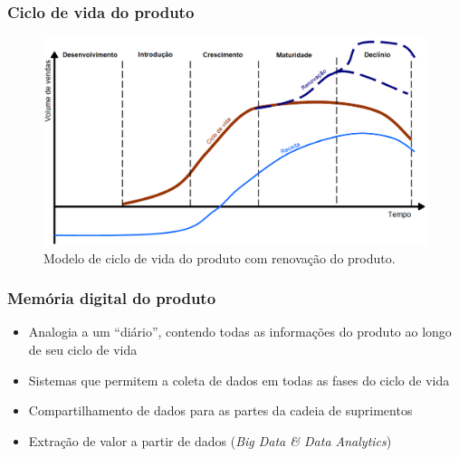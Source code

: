 \documentclass[10pt]{beamer}
\begin{document}
\begin{frame}
	
	\frametitle{Ciclo de vida do produto} 
	
	\begin{figure}[htb]
		\centering
		\caption{Modelo de ciclo de vida do produto com renovação do produto.}
		\label{fig:ciclo-de-vida-extensao}
		\includegraphics[width=1\textwidth]{ciclo-de-vida-extensao.png}
	\end{figure}
	
\end{frame}
\begin{frame}
	
	\frametitle{Memória digital do produto} 
	
	\begin{itemize}
		\item Analogia a um ``diário'', contendo todas as informações do produto ao longo de seu ciclo de vida
		\item Sistemas que permitem a coleta de dados em todas as fases do ciclo de vida
		\item Compartilhamento de dados para as partes da cadeia de suprimentos
		\item Extração de valor a partir de dados (\textit{Big Data \& Data Analytics})
	\end{itemize}
	
\end{frame}
\end{document}
